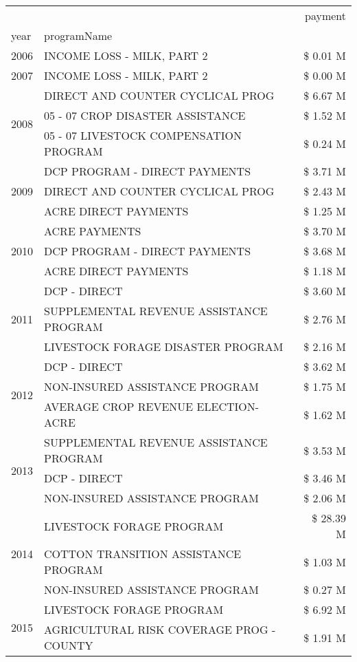 \begin{tabular}{llr}
\toprule
 &  & payment \\
year & programName &  \\
\midrule
2006 & INCOME LOSS - MILK, PART 2 & \$ 0.01 M \\
\cline{1-3}
2007 & INCOME LOSS - MILK, PART 2 & \$ 0.00 M \\
\cline{1-3}
\multirow[t]{3}{*}{2008} & DIRECT AND COUNTER CYCLICAL PROG & \$ 6.67 M \\
 & 05 - 07 CROP DISASTER ASSISTANCE & \$ 1.52 M \\
 & 05 - 07 LIVESTOCK COMPENSATION PROGRAM & \$ 0.24 M \\
\cline{1-3}
\multirow[t]{3}{*}{2009} & DCP PROGRAM - DIRECT PAYMENTS & \$ 3.71 M \\
 & DIRECT AND COUNTER CYCLICAL PROG & \$ 2.43 M \\
 & ACRE DIRECT PAYMENTS & \$ 1.25 M \\
\cline{1-3}
\multirow[t]{3}{*}{2010} & ACRE PAYMENTS & \$ 3.70 M \\
 & DCP PROGRAM - DIRECT PAYMENTS & \$ 3.68 M \\
 & ACRE DIRECT PAYMENTS & \$ 1.18 M \\
\cline{1-3}
\multirow[t]{3}{*}{2011} & DCP - DIRECT & \$ 3.60 M \\
 & SUPPLEMENTAL REVENUE ASSISTANCE PROGRAM & \$ 2.76 M \\
 & LIVESTOCK FORAGE DISASTER PROGRAM & \$ 2.16 M \\
\cline{1-3}
\multirow[t]{3}{*}{2012} & DCP - DIRECT & \$ 3.62 M \\
 & NON-INSURED ASSISTANCE PROGRAM & \$ 1.75 M \\
 & AVERAGE CROP REVENUE ELECTION-ACRE & \$ 1.62 M \\
\cline{1-3}
\multirow[t]{3}{*}{2013} & SUPPLEMENTAL REVENUE ASSISTANCE PROGRAM & \$ 3.53 M \\
 & DCP - DIRECT & \$ 3.46 M \\
 & NON-INSURED ASSISTANCE PROGRAM & \$ 2.06 M \\
\cline{1-3}
\multirow[t]{3}{*}{2014} & LIVESTOCK FORAGE PROGRAM & \$ 28.39 M \\
 & COTTON TRANSITION ASSISTANCE PROGRAM & \$ 1.03 M \\
 & NON-INSURED ASSISTANCE PROGRAM & \$ 0.27 M \\
\cline{1-3}
\multirow[t]{3}{*}{2015} & LIVESTOCK FORAGE PROGRAM & \$ 6.92 M \\
 & AGRICULTURAL RISK COVERAGE PROG - COUNTY & \$ 1.91 M \\

\end{tabular}
